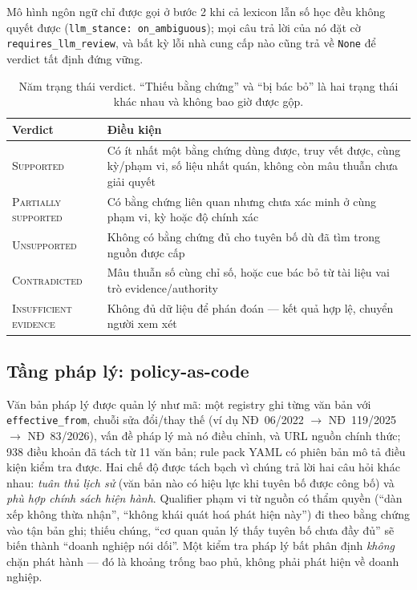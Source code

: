 \documentclass[11pt,a4paper]{article}
\newcommand{\code}[1]{\texttt{#1}}
\newcommand{\status}[1]{\textsc{#1}}
\begin{document}
Mô hình ngôn ngữ chỉ được gọi ở bước 2 khi cả lexicon lẫn số học đều không quyết được (\code{llm\_stance: on\_ambiguous}); mọi câu trả lời của nó đặt cờ \code{requires\_llm\_review}, và bất kỳ lỗi nhà cung cấp nào cũng trả về \code{None} để verdict tất định đứng vững.

\begin{table}[!htbp]\small
\begin{tabularx}{\linewidth}{L{3.6cm} X}
\toprule
\textbf{Verdict} & \textbf{Điều kiện} \\
\midrule
\status{Supported} & Có ít nhất một bằng chứng dùng được, truy vết được, cùng kỳ/phạm vi, số liệu nhất quán, không còn mâu thuẫn chưa giải quyết \\
\status{Partially supported} & Có bằng chứng liên quan nhưng chưa xác minh ở cùng phạm vi, kỳ hoặc độ chính xác \\
\status{Unsupported} & Không có bằng chứng đủ cho tuyên bố dù đã tìm trong nguồn được cấp \\
\status{Contradicted} & Mâu thuẫn số cùng chỉ số, hoặc cue bác bỏ từ tài liệu vai trò evidence/authority \\
\status{Insufficient evidence} & Không đủ dữ liệu để phán đoán — kết quả hợp lệ, chuyển người xem xét \\
\bottomrule
\end{tabularx}
\caption{Năm trạng thái verdict. ``Thiếu bằng chứng'' và ``bị bác bỏ'' là hai trạng thái khác nhau và không bao giờ được gộp.}
\end{table}

\subsection{Tầng pháp lý: policy-as-code}

Văn bản pháp lý được quản lý như mã: một registry ghi từng văn bản với \code{effective\_from}, chuỗi sửa đổi/thay thế (ví dụ NĐ~06/2022 $\to$ NĐ~119/2025 $\to$ NĐ~83/2026), vấn đề pháp lý mà nó điều chỉnh, và URL nguồn chính thức; 938 điều khoản đã tách từ 11 văn bản; rule pack YAML có phiên bản mô tả điều kiện kiểm tra được. Hai chế độ được tách bạch vì chúng trả lời hai câu hỏi khác nhau: \emph{tuân thủ lịch sử} (văn bản nào có hiệu lực khi tuyên bố được công bố) và \emph{phù hợp chính sách hiện hành}. Qualifier phạm vi từ nguồn có thẩm quyền (``dàn xếp không thừa nhận'', ``không khái quát hoá phát hiện này'') đi theo bằng chứng vào tận bản ghi; thiếu chúng, ``cơ quan quản lý thấy tuyên bố chưa đầy đủ'' sẽ biến thành ``doanh nghiệp nói dối''. Một kiểm tra pháp lý bất phân định \emph{không} chặn phát hành — đó là khoảng trống bao phủ, không phải phát hiện về doanh nghiệp.
\end{document}
